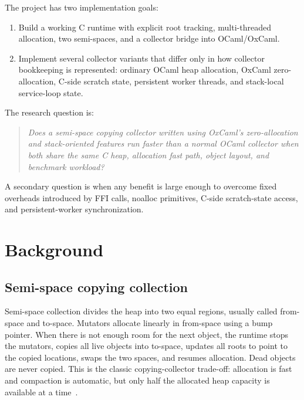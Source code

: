 \documentclass[11pt,a4paper]{article}
\begin{document}
The project has two implementation goals:
\begin{enumerate}
  \item Build a working C runtime with explicit root tracking, multi-threaded
  allocation, two semi-spaces, and a collector bridge into OCaml/OxCaml.
  \item Implement several collector variants that differ only in how collector
  bookkeeping is represented: ordinary OCaml heap allocation, OxCaml
  zero-allocation, C-side scratch state, persistent worker threads, and
  stack-local service-loop state.
\end{enumerate}

The research question is:

\begin{quote}
\emph{Does a semi-space copying collector written using OxCaml's
zero-allocation and stack-oriented features run faster than a normal OCaml
collector when both share the same C heap, allocation fast path, object layout,
and benchmark workload?}
\end{quote}

A secondary question is when any benefit is large enough to overcome fixed
overheads introduced by FFI calls, noalloc primitives, C-side scratch-state
access, and persistent-worker synchronization.

\section{Background}
\label{sec:background}

\subsection{Semi-space copying collection}

Semi-space collection divides the heap into two equal regions, usually called
from-space and to-space.  Mutators allocate linearly in from-space using a bump
pointer.  When there is not enough room for the next object, the runtime stops
the mutators, copies all live objects into to-space, updates all roots to point
to the copied locations, swaps the two spaces, and resumes allocation.  Dead
objects are never copied.  This is the classic copying-collector trade-off:
allocation is fast and compaction is automatic, but only half the allocated heap
capacity is available at a time~\cite{wilson1992,gcHandbook}.
\end{document}

